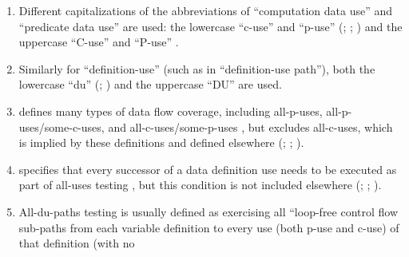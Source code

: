 \begin{enumerate}
    \item %
          Different capitalizations of the abbreviations of ``computation data
          use'' and ``predicate data use'' are used: the lowercase ``\acs{c-use}''
          and ``\acs{p-use}'' (\citealp[pp.~3, 27-29, 35-36, 114-155, 117-118,
              129]{IEEE2021}; \citeyear[p.~124]{IEEE2017};
          \citealp[p.~477, Tab.~12.6]{PetersAndPedrycz2000}) and the uppercase
          ``C-use'' and ``P-use'' \citep[pp.~424-425]{vanVliet2000}.
    \item %
          Similarly for ``definition-use'' (such as in ``definition-use
          path''), both the lowercase ``du'' (\citealp[pp.~3, 27, 29, 35,
              119-121, 129]{IEEE2021}; \citealp[pp.~478-479]{
              PetersAndPedrycz2000}) and the uppercase ``DU''
          \citep[p.~425]{vanVliet2000} are used.
    \item %
           {} defines many types of data flow
          coverage, including all-\acsp{p-use}, all-\acsp{p-use}/some-\acsp{c-use}, and
          all-\acsp{c-use}/some-\acsp{p-use} \citeyearpar[p.~425]{vanVliet2000}, but
          excludes all-\acsp{c-use}, which is implied by these definitions and
          defined elsewhere (\citealp[p.~27]{IEEE2021};
          \citeyear[p.~83]{IEEE2017}; \citealp[p.~479]{PetersAndPedrycz2000}).
    \item %
           {} specifies that every successor
          of a data definition use needs to be executed as part of all-uses
          testing \citeyearpar[pp.~424-425]{vanVliet2000}, but this condition
          is not included elsewhere (\citealp[pp.~28-29]{IEEE2021};
          \citeyear[p.~120]{IEEE2017}; \citealp[pp.~478-479]{PetersAndPedrycz2000}).
    \item %
          All-\acsp{du-path} testing is usually defined as exercising all
          ``loop-free control flow sub-paths from each variable definition to
          every use (both \acs{p-use} and \acs{c-use}) of that definition (with no

\end{enumerate}
